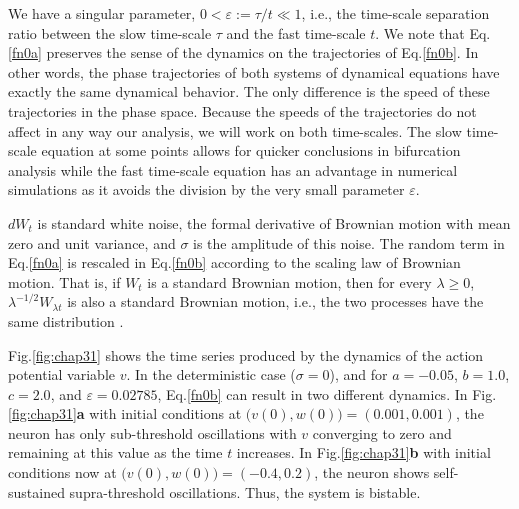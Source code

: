 We have a singular parameter, $0<\varepsilon:=\tau/t\ll1$, i.e.,
the time-scale separation ratio between the slow time-scale $\tau$
and the fast time-scale $t$. We note that Eq.\eqref{fn0a}
preserves the sense of the dynamics on the trajectories of
Eq.\eqref{fn0b}. In other words, the phase trajectories of both
systems of dynamical equations have exactly the same dynamical
behavior. The only difference is the speed of these trajectories
in the phase space. Because the speeds of the trajectories do not
affect in any way our analysis, we will work on both time-scales.
The slow time-scale equation at some points allows for quicker
conclusions in bifurcation analysis while the fast time-scale
equation has an advantage in numerical simulations as it
avoids the division by the very small parameter $\varepsilon$.

$dW_t$ is standard white noise, the formal derivative of
Brownian motion with mean zero and unit variance, and $\sigma$ is
the amplitude of this noise. The random term in Eq.\eqref{fn0a} is rescaled in Eq.\eqref{fn0b} 
according to the scaling law of Brownian motion. That is,
if $ W_t$ is a standard Brownian motion, then for every 
$\lambda\geq0$, $\lambda^{-1/2} W_{\lambda t}$ is also a standard
Brownian motion, i.e., the two processes have the same distribution \cite{Durrett}.

Fig.\ref{fig:chap31} shows the time series produced by 
the dynamics of the action potential variable $v$.
In the deterministic case ($\sigma=0$), and for
$a=-0.05$, $b=1.0$, $c=2.0$, and $\varepsilon=0.02785$,
Eq.\eqref{fn0b} can result in  two different dynamics.
In Fig.\ref{fig:chap31}\textbf{a} with initial conditions at
$\big(v(0),w(0)\big)=(0.001,0.001)$, the neuron has only sub-threshold
oscillations with $v$ converging  to zero
and remaining at this value as the time $t$ increases.
In Fig.\ref{fig:chap31}\textbf{b} with initial conditions now at
$\big(v(0),w(0)\big)=(-0.4,0.2)$, the neuron shows self-sustained
supra-threshold oscillations. Thus, the system is bistable.

